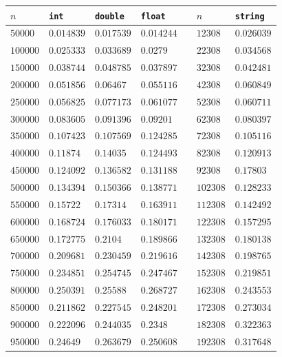 \documentclass[12pt]{article}
\begin{document}
    \begin{table}
        \centering
        \begin{tabular}{|l|l|l|l||l||l|l|}
             \hline
            $n$ & \verb|int| & \verb|double| & \verb|float| &\qquad\qquad& $n$ & \verb|string| \\
             \hline
            $50000$ & $0.014839$& $0.017539$& $0.014244$&&$12308$ & $0.026039$ \\
            $100000$ & $0.025333$& $0.033689$& $0.0279$&&$22308$ & $0.034568$ \\
            $150000$ & $0.038744$& $0.048785$& $0.037897$&&$32308$ & $0.042481$ \\
            $200000$ & $0.051856$& $0.06467$& $0.055116$&&$42308$ & $0.060849$ \\
            $250000$ & $0.056825$& $0.077173$& $0.061077$&&$52308$ & $0.060711$ \\
            $300000$ & $0.083605$& $0.091396$& $0.09201$&&$62308$ & $0.080397$ \\
            $350000$ & $0.107423$& $0.107569$& $0.124285$&&$72308$ & $0.105116$ \\
            $400000$ & $0.11874$& $0.14035$& $0.124493$&&$82308$ & $0.120913$ \\
            $450000$ & $0.124092$& $0.136582$& $0.131188$&&$92308$ & $0.17803$ \\
            $500000$ & $0.134394$& $0.150366$& $0.138771$&&$102308$ & $0.128233$ \\
            $550000$ & $0.15722$& $0.17314$& $0.163911$&&$112308$ & $0.142492$ \\
            $600000$ & $0.168724$& $0.176033$& $0.180171$&&$122308$ & $0.157295$ \\
            $650000$ & $0.172775$& $0.2104$& $0.189866$&&$132308$ & $0.180138$ \\
            $700000$ & $0.209681$& $0.230459$& $0.219616$&&$142308$ & $0.198765$ \\
            $750000$ & $0.234851$& $0.254745$& $0.247467$&&$152308$ & $0.219851$ \\
            $800000$ & $0.250391$& $0.25588$& $0.268727$&&$162308$ & $0.243553$ \\
            $850000$ & $0.211862$& $0.227545$& $0.248201$&&$172308$ & $0.273034$ \\
            $900000$ & $0.222096$& $0.244035$& $0.2348$&&$182308$ & $0.322363$ \\
            $950000$ & $0.24649$& $0.263679$& $0.250608$&&$192308$ & $0.317648$ \\

\end{tabular}
\end{table}
\end{document}
